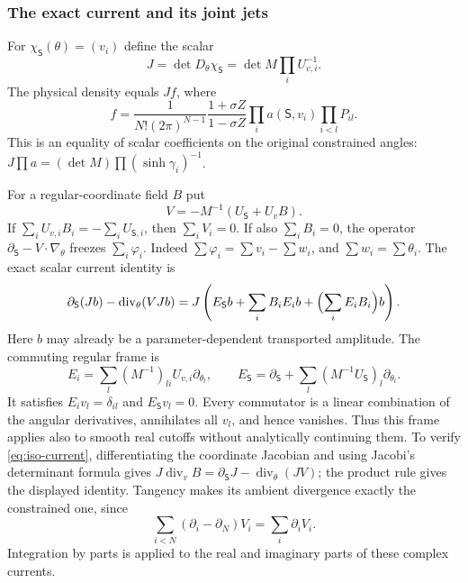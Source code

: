 \documentclass[11pt]{article}
\numberwithin{equation}{section}
\theoremstyle{definition}
\begin{document}
\subsubsection{The exact current and its joint jets}

For $\chi_{\mathsf S}(\theta)=(v_i)$ define the scalar
\[
 J=\det D_\theta\chi_{\mathsf S}
    =\det M\prod_i U_{v,i}^{-1}.
\]
The physical density equals $Jf$, where
\begin{equation}\label{eq:iso-regular-density}
 f=\frac1{N!(2\pi)^{N-1}}
       \frac{1+\sigma Z}{1-\sigma Z}
       \prod_i a(\mathsf S,v_i)\prod_{i<l}P_{il}.
\end{equation}
This is an equality of scalar coefficients on the original constrained
angles: $J\prod a=(\det M)\prod(\sinh\gamma_i)^{-1}$.

For a regular-coordinate field $B$ put
\begin{equation}\label{eq:iso-angular-field}
 V=-M^{-1}(U_{\mathsf S}+U_vB).
\end{equation}
If $\sum_iU_{v,i}B_i=-\sum_iU_{\mathsf S,i}$, then $\sum_iV_i=0$.
If also $\sum_iB_i=0$, the operator
$\partial_{\mathsf S}-V\cdot\nabla_\theta$ freezes $\sum_i\varphi_i$.
Indeed $\sum\varphi_i=\sum v_i-\sum w_i$, and $\sum w_i=\sum\theta_i$.
The exact scalar current identity is
\begin{equation}\label{eq:iso-current}
 \partial_{\mathsf S}(Jb)-\operatorname{div}_\theta(VJb)
  =J\left(E_{\mathsf S}b+\sum_i B_iE_i b
                           +\Bigl(\sum_iE_iB_i\Bigr)b\right).
\end{equation}
Here $b$ may already be a parameter-dependent transported amplitude.
The commuting regular frame is
\[
 E_i=\sum_l(M^{-1})_{li}U_{v,i}\partial_{\theta_l},\qquad
 E_{\mathsf S}=\partial_{\mathsf S}
                  +\sum_l(M^{-1}U_{\mathsf S})_l\partial_{\theta_l}.
\]
It satisfies $E_i v_l=\delta_{il}$ and $E_{\mathsf S}v_l=0$.
Every commutator is a linear combination of the angular derivatives,
annihilates all $v_l$, and hence vanishes.  Thus this frame applies
also to smooth real cutoffs without analytically continuing them.
To verify \eqref{eq:iso-current}, differentiating the coordinate
Jacobian and using Jacobi's determinant formula gives
$J\operatorname{div}_vB=\partial_{\mathsf S}J-\operatorname{div}_\theta(JV)$;
the product rule gives the displayed identity.  Tangency makes its
ambient divergence exactly the constrained one, since
\[
 \sum_{i<N}(\partial_i-\partial_N)V_i=\sum_i\partial_iV_i.
\]
Integration by parts is applied to the real and imaginary parts of
these complex currents.
\end{document}
